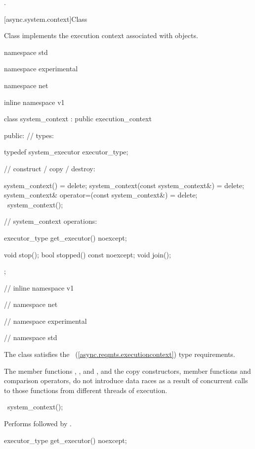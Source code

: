 \begin{itemdescr}
\pnum
\returns {}.
\end{itemdescr}




[async.system.context]{Class }

\pnum
Class  implements the execution context associated with  objects.

\begin{codeblock}
namespace std {
namespace experimental {
namespace net {
inline namespace v1 {

  class system_context : public execution_context
  {
  public:
    // types:

    typedef system_executor executor_type;

    // construct / copy / destroy:

    system_context() = delete;
    system_context(const system_context&) = delete;
    system_context& operator=(const system_context&) = delete;
    ~system_context();

    // system_context operations:

    executor_type get_executor() noexcept;

    void stop();
    bool stopped() const noexcept;
    void join();
  };

} // inline namespace v1
} // namespace net
} // namespace experimental
} // namespace std
\end{codeblock}

\pnum
The class  satisfies the ~(\ref{async.reqmts.executioncontext}) type requirements.

\pnum
The  member functions , , and , and the  copy constructors, member functions and comparison operators, do not introduce data races as a result of concurrent calls to those functions from different threads of execution.

\begin{itemdecl}
~system_context();
\end{itemdecl}

\begin{itemdescr}
\pnum
\effects Performs  followed by .
\end{itemdescr}

\begin{itemdecl}
executor_type get_executor() noexcept;
\end{itemdecl}

